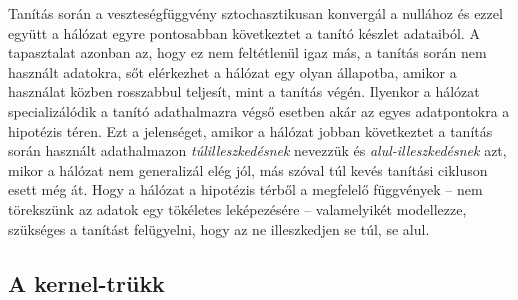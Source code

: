 Tanítás során a veszteségfüggvény sztochasztikusan konvergál a nullához és ezzel együtt a hálózat egyre pontosabban következtet a tanító készlet adataiból. A tapasztalat azonban az, hogy ez nem feltétlenül igaz más, a tanítás során nem használt adatokra, sőt elérkezhet a hálózat egy olyan állapotba, amikor a használat közben rosszabbul teljesít, mint a tanítás végén. Ilyenkor a hálózat specializálódik a tanító adathalmazra végső esetben akár az egyes adatpontokra a hipotézis téren. Ezt a jelenséget, amikor a hálózat jobban következtet a tanítás során használt adathalmazon \emph{túlilleszkedésnek} nevezzük és \emph{alul-illeszkedésnek} azt, mikor a hálózat nem generalizál elég jól, más szóval túl kevés tanítási cikluson esett még át. Hogy a hálózat a hipotézis térből a megfelelő függvények -- nem törekszünk az adatok egy tökéletes leképezésére -- valamelyikét modellezze, szükséges a tanítást felügyelni, hogy az ne illeszkedjen se túl, se alul.
\subsection{A kernel-trükk}

